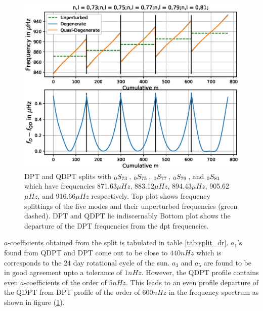 \begin{figure}[h!]
\includegraphics[scale=0.8,center]{Chapter4/figs/dr_split}
\caption{DPT and QDPT splits with $_{0}S_{73}\,$, $_{0}S_{75}\,$, $_{0}S_{77}\,$, $_{0}S_{79}\,$, and $_{0}S_{81}\,$ which have frequencies 871.63$\mu Hz$, 883.12$\mu Hz$, 894.43$\mu Hz$, 905.62$\mu Hz$, and 916.66$\mu Hz$ respectively. Top plot shows frequency splittings of the five modes and their unperturbed frequencies (green dashed). DPT and QDPT lie indiscernably   Bottom plot shows the departure of the DPT frequencies from the dpt frequencies.}
\label{fig:split_dr}
\end{figure}

$a$-coefficients obtained from the split is tabulated in table \ref{tab:split_dr}. $a_1$'s found from QDPT and DPT come out to be close to $440nHz$ which is corresponds to the $24$ day rotational cycle of the sun. $a_3$ and $a_5$ are found to be in good agreement upto a tolerance of $1nHz$. However, the QDPT profile contains even $a$-coefficients of the order of $5nHz$. This leads to an even profile departure of the QDPT from DPT profile of the order of $600nHz$ in the frequency spectrum as shown in figure (\ref{fig:split_dr}).

